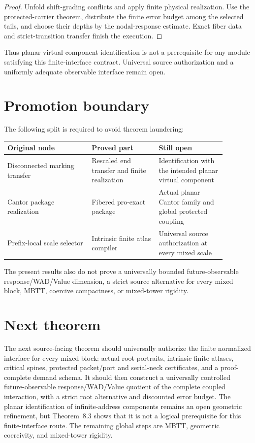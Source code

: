 \documentclass[11pt]{article}
\theoremstyle{definition}
\theoremstyle{remark}
\begin{document}
\begin{proof}
Unfold shift-grading conflicts and apply finite physical realization.  Use the
protected-carrier theorem, distribute the finite error budget among the
selected tails, and choose their depths by the nodal-response estimate.  Exact
fiber data and strict-transition transfer finish the execution.
\end{proof}

Thus planar virtual-component identification is not a prerequisite for any
module satisfying this finite-interface contract.  Universal source
authorization and a uniformly adequate observable interface remain open.

\section{Promotion boundary}
The following split is required to avoid theorem laundering:
\begin{center}
\begin{tabular}{p{0.34\linewidth}p{0.27\linewidth}p{0.27\linewidth}}
\toprule
Original node & Proved part & Still open \\
\midrule
Disconnected marking transfer & Rescaled end transfer and finite realization & Identification with the intended planar virtual component \\
Cantor package realization & Fibered pro-exact package & Actual planar Cantor family and global protected coupling \\
Prefix-local scale selector & Intrinsic finite atlas compiler & Universal source authorization at every mixed scale \\
\bottomrule
\end{tabular}
\end{center}

The present results also do not prove a universally bounded future-observable
response/\allowbreak WAD/\allowbreak Value dimension, a strict source alternative for every mixed
block, MBTT, coercive compactness, or mixed-tower rigidity.

\section{Next theorem}
The next source-facing theorem should universally authorize the finite
normalized interface for every mixed block: actual root portraits, intrinsic
finite atlases, critical spines, protected packet/port and serial-neck
certificates, and a proof-complete demand schema.  It should then construct a
universally controlled future-observable response/WAD/Value quotient of the
complete coupled interaction, with a strict root alternative and discounted
error budget.  The planar identification of infinite-address components
remains an open geometric refinement, but Theorem~8.3 shows that it is not a
logical prerequisite for this finite-interface route.  The remaining global
steps are MBTT, geometric coercivity, and mixed-tower rigidity.
\end{document}
